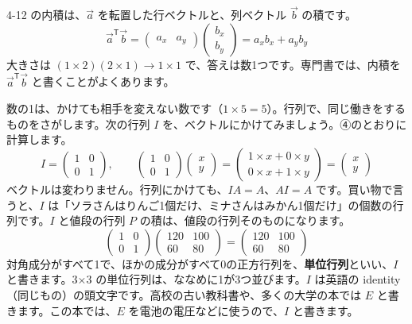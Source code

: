 \noindent\begin{minipage}{\linewidth}
\begin{motto}[3]
4-12 の内積は、$\vec a$ を転置した行ベクトルと、列ベクトル $\vec b$ の積です。
\[ \vec a^{\mathsf T}\vec b=\begin{pmatrix} a_x & a_y \end{pmatrix}\begin{pmatrix} b_x\\ b_y \end{pmatrix}=a_xb_x+a_yb_y \]
大きさは $(1\times2)(2\times1)\to1\times1$ で、答えは数1つです。専門書では、内積を $\vec a^{\mathsf T}\vec b$ と書くことがよくあります。
\end{motto}
\end{minipage}


\label{bk:7-1:tan-i}数の1は、かけても相手を変えない数です（$1\times5=5$）。行列で、同じ働きをするものをさがします。次の行列 $I$ を、ベクトルにかけてみましょう。④のとおりに計算します。
\[ I=\begin{pmatrix} 1 & 0\\ 0 & 1 \end{pmatrix},\qquad \begin{pmatrix} 1 & 0\\ 0 & 1 \end{pmatrix}\begin{pmatrix} x\\ y \end{pmatrix}=\begin{pmatrix} 1\times x+0\times y\\ 0\times x+1\times y \end{pmatrix}=\begin{pmatrix} x\\ y \end{pmatrix} \]
ベクトルは変わりません。行列にかけても、$IA=A$、$AI=A$ です。買い物で言うと、$I$ は「ソラさんはりんご1個だけ、ミナさんはみかん1個だけ」の個数の行列です。$I$ と値段の行列 $P$ の積は、値段の行列そのものになります。
\[ \begin{pmatrix} 1 & 0\\ 0 & 1 \end{pmatrix}\begin{pmatrix} 120 & 100\\ 60 & 80 \end{pmatrix}=\begin{pmatrix} 120 & 100\\ 60 & 80 \end{pmatrix} \]
対角成分がすべて1で、ほかの成分がすべて0の正方行列を、\textbf{単位行列}といい、$I$ と書きます。3×3 の単位行列は、ななめに1が3つ並びます。$I$ は英語の identity（同じもの）の頭文字です。高校の古い教科書や、多くの大学の本では $E$ と書きます。この本では、$E$ を電池の電圧などに使うので、$I$ と書きます。

